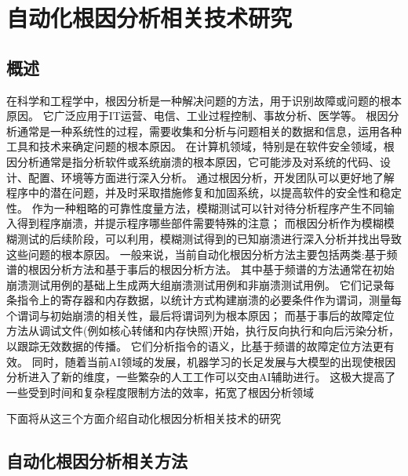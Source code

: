 


\section{自动化根因分析相关技术研究}
\subsection{概述}
在科学和工程学中，根因分析是一种解决问题的方法，用于识别故障或问题的根本原因。
它广泛应用于IT运营、电信、工业过程控制、事故分析、医学等。
根因分析通常是一种系统性的过程，需要收集和分析与问题相关的数据和信息，运用各种工具和技术来确定问题的根本原因。
在计算机领域，特别是在软件安全领域，根因分析通常是指分析软件或系统崩溃的根本原因，它可能涉及对系统的代码、设计、配置、环境等方面进行深入分析。
通过根因分析，开发团队可以更好地了解程序中的潜在问题，并及时采取措施修复和加固系统，以提高软件的安全性和稳定性。
作为一种粗略的可靠性度量方法，模糊测试可以针对待分析程序产生不同输入得到程序崩溃，并提示程序哪些部件需要特殊的注意；
而根因分析作为模糊模糊测试的后续阶段，可以利用，模糊测试得到的已知崩溃进行深入分析并找出导致这些问题的根本原因。
一般来说，当前自动化根因分析方法主要包括两类:基于频谱的根因分析方法和基于事后的根因分析方法。
其中基于频谱的方法通常在初始崩溃测试用例的基础上生成两大组崩溃测试用例和非崩溃测试用例。
它们记录每条指令上的寄存器和内存数据，以统计方式构建崩溃的必要条件作为谓词，测量每个谓词与初始崩溃的相关性，最后将谓词列为根本原因；
而基于事后的故障定位方法从调试文件(例如核心转储和内存快照)开始，执行反向执行和向后污染分析，以跟踪无效数据的传播。
它们分析指令的语义，比基于频谱的故障定位方法更有效。
同时，随着当前AI领域的发展，机器学习的长足发展与大模型的出现使根因分析进入了新的维度，一些繁杂的人工工作可以交由AI辅助进行。
这极大提高了一些受到时间和复杂程度限制方法的效率，拓宽了根因分析领域

下面将从这三个方面介绍自动化根因分析相关技术的研究
\subsection{自动化根因分析相关方法}

